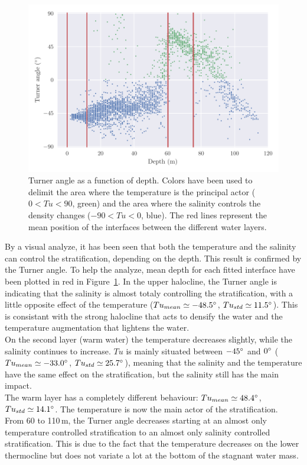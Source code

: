 \documentclass[12pt,a4paper]{article}
\begin{document}
\begin{figure}[h]
  \centering
  \includegraphics{turner}
  \caption{\label{fig:turner}Turner angle as a function of depth.
    Colors have been used to delimit the area where the temperature
    is the principal actor ($0<Tu<90$, green)
    and the area where the salinity controls the density changes ($-90<Tu<0$, blue).
    The red lines represent the mean position of the interfaces between the
    different water layers.}
\end{figure}
By a visual analyze, it has been seen that both the temperature and the salinity can control
the stratification, depending on the depth. This result is confirmed by the
Turner angle. To help the analyze, mean depth for each
fitted interface have been plotted in red in Figure~\ref{fig:turner}.
In the upper halocline, the Turner angle is indicating that the salinity
is almost totaly controlling the stratification, with a little opposite
effect of the temperature ($Tu_{mean} \simeq -48.5^{\circ}$, $Tu_{std} \simeq 11.5^{\circ}$).
This is consistant with the strong halocline that acts to densify the
water and the temperature augmentation that lightens the water.\\
On the second layer (warm water) the temperature decreases slightly,
while the salinity continues to increase.
$Tu$ is mainly situated between $-45^{\circ}$ and $0^{\circ}$
($Tu_{mean} \simeq -33.0^{\circ}$,
$Tu_{std} \simeq 25.7^{\circ}$), meaning that
the salinity and the temperature have the same effect on the stratification,
but the salinity still has the main impact.\\
The warm layer has a completely different behaviour:
$Tu_{mean} \simeq 48.4^{\circ}$, $Tu_{std} \simeq 14.1^{\circ}$.
The temperature is now the main actor of the stratification.\\
From 60 to 110\,m, the Turner angle decreases starting at an almost
only temperature controlled stratification to an almost only salinity controlled
stratification. This is due to the fact that the temperature decreases
on the lower thermocline but does not variate a lot at the bottom
of the stagnant water mass.
\end{document}
